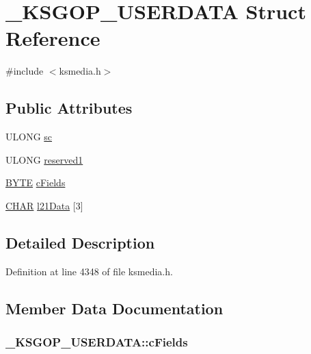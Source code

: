 \hypertarget{struct___k_s_g_o_p___u_s_e_r_d_a_t_a}{}\section{\+\_\+\+K\+S\+G\+O\+P\+\_\+\+U\+S\+E\+R\+D\+A\+TA Struct Reference}
\label{struct___k_s_g_o_p___u_s_e_r_d_a_t_a}


{\ttfamily \#include $<$ksmedia.\+h$>$}

\subsection*{Public Attributes}
\begin{DoxyCompactItemize}
\item 
U\+L\+O\+NG \hyperlink{struct___k_s_g_o_p___u_s_e_r_d_a_t_a_afab4d89a4d0fedc49bedd2d4f8b259e8}{sc}
\item 
U\+L\+O\+NG \hyperlink{struct___k_s_g_o_p___u_s_e_r_d_a_t_a_ad53a643d4f9f2cd8993939e0b3796582}{reserved1}
\item 
\hyperlink{mapinls_8h_a4ae1dab0fb4b072a66584546209e7d58}{B\+Y\+TE} \hyperlink{struct___k_s_g_o_p___u_s_e_r_d_a_t_a_ad5ed9756e8b487723458924d5d632f62}{c\+Fields}
\item 
\hyperlink{mapinls_8h_aebb9e13210d88d43e32e735ada43a425}{C\+H\+AR} \hyperlink{struct___k_s_g_o_p___u_s_e_r_d_a_t_a_acafeb74d6925ec55c26dca83f4e94e6d}{l21\+Data} \mbox{[}3\mbox{]}
\end{DoxyCompactItemize}


\subsection{Detailed Description}


Definition at line 4348 of file ksmedia.\+h.



\subsection{Member Data Documentation}
\subsubsection[{\texorpdfstring{c\+Fields}{cFields}}]{ \+\_\+\+K\+S\+G\+O\+P\+\_\+\+U\+S\+E\+R\+D\+A\+T\+A\+::c\+Fields}\hypertarget{struct___k_s_g_o_p___u_s_e_r_d_a_t_a_ad5ed9756e8b487723458924d5d632f62}{}\label{struct___k_s_g_o_p___u_s_e_r_d_a_t_a_ad5ed9756e8b487723458924d5d632f62}


